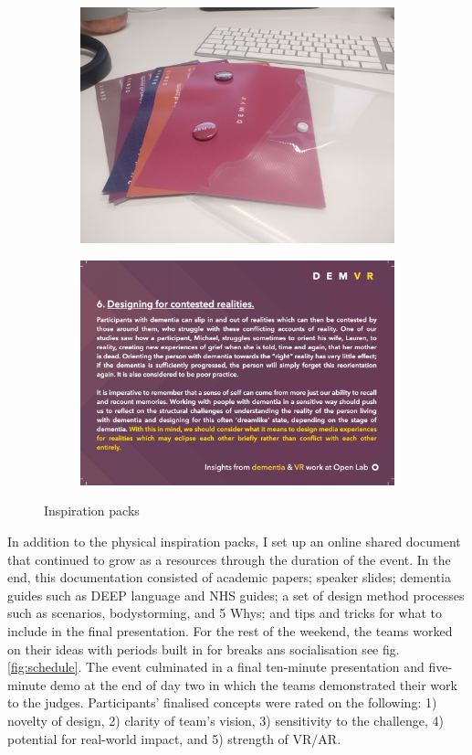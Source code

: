 \begin{figure}
\centering
\begin{subfigure}{.5\textwidth}
  \centering
  \includegraphics[width=.8\linewidth]{Images/DemVRInspiration.jpeg}
  \label{fig:InspirationPackImage}
\end{subfigure}%
\begin{subfigure}{.5\textwidth}
  \centering
  \includegraphics[width=.8\linewidth]{Images/InspirationCard.png}
  \label{fig:InspirationCard}
\end{subfigure}
\caption{Inspiration packs}
\label{fig:InspirationPacks}
\end{figure}

In addition to the physical inspiration packs, I set up an online shared document that continued to grow as a resources through the duration of the event. In the end, this documentation consisted of academic papers; speaker slides; dementia guides such as DEEP language and NHS guides; a set of design method processes such as scenarios, bodystorming, and 5 Whys; and tips and tricks for what to include in the final presentation. For the rest of the weekend, the teams worked on their ideas with periods built in for breaks ans socialisation see fig.\ref{fig:schedule}. The event culminated in a final ten-minute presentation and five-minute demo at the end of day two in which the teams demonstrated their work to the judges. Participants' finalised concepts were rated on the following: 1) novelty of design, 2) clarity of team's vision, 3) sensitivity to the challenge, 4) potential for real-world impact, and 5) strength of VR/AR.

